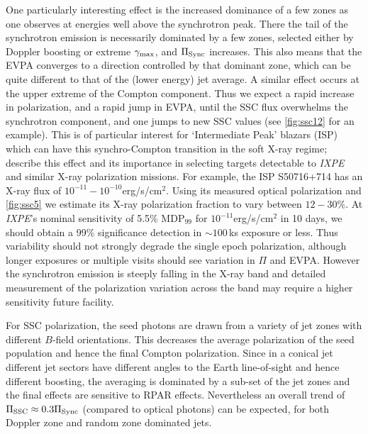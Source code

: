One particularly interesting effect is the increased dominance of a few zones as one observes at energies well above the synchrotron peak. There the tail of the synchrotron emission is necessarily dominated by a few zones, selected either by Doppler boosting or extreme $\gamma_{\rm max}$, and $\Pi_{\rm Sync}$ increases. This also means that the EVPA converges to a direction controlled by that dominant zone, which can be quite different to that of the (lower energy) jet average. A similar effect occurs at the upper extreme of the Compton component. Thus we expect a rapid increase in polarization, and a rapid jump in EVPA, until the SSC flux overwhelms the synchrotron component, and one jumps to new SSC values (see \cref{fig:ssc12} for an example). This is of particular interest for `Intermediate Peak' blazars (ISP) which can have this synchro-Compton transition in the soft X-ray regime; \citet{liodakis_prospects_2019} describe this effect and its importance in selecting targets detectable to {\it IXPE} and similar X-ray polarization missions. For example, the ISP S50716+714 has an X-ray flux of $10^{-11} - 10^{-10}$erg/s/cm$^2$. Using its measured optical polarization and \cref{fig:ssc5} we estimate its X-ray polarization fraction to vary between $12-30\%$. At \textit{IXPE}'s nominal sensitivity of 5.5\% MDP$_{99}$ for $10^{-11}$erg/s/cm$^2$ in 10 days, we should obtain a 99\% significance detection in $\sim 100$\,ks exposure or less. Thus variability should not strongly degrade the single epoch polarization, although longer exposures or multiple visits should see variation in $\Pi$ and EVPA. However the synchrotron emission is steeply falling in the X-ray band and detailed measurement of the polarization variation across the band may require a higher sensitivity future facility. 

For SSC polarization, the seed photons are drawn from a variety of jet zones with different $B$-field orientations. This decreases the average polarization of the seed population and hence the final Compton polarization. Since in a conical jet different jet sectors have different angles to the Earth line-of-sight and hence different boosting, the averaging is dominated by a sub-set of the jet zones and the final effects are sensitive to RPAR effects.
Nevertheless an overall trend of $\Pi_{\rm SSC} \approx 0.3 \Pi_{\rm Sync}$ (compared to optical photons) can be expected, for both Doppler zone and random zone dominated jets.

